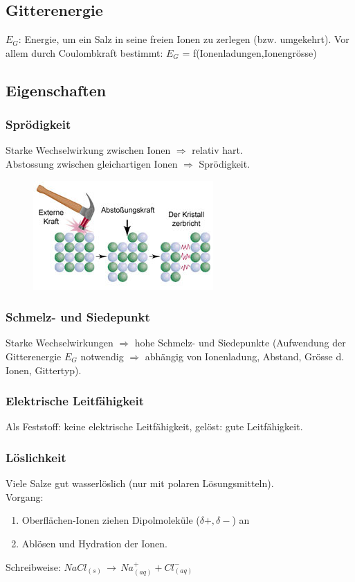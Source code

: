 \subsection{Gitterenergie}
$E_G$: Energie, um ein Salz in seine freien Ionen zu zerlegen (bzw. umgekehrt). Vor allem durch Coulombkraft bestimmt: $E_G$ = f(Ionenladungen,Ionengrösse) \\

\subsection{Eigenschaften}
\subsubsection{Sprödigkeit}
Starke Wechselwirkung zwischen Ionen $\Rightarrow$ relativ hart. \\
Abstossung zwischen gleichartigen Ionen $\Rightarrow$ Sprödigkeit. \\
\begin{figure}[htbp]
	\centering
	\includegraphics[width=0.5\linewidth]{images/5_Sproedigkeit.png}
\end{figure}

\subsubsection{Schmelz- und Siedepunkt}
Starke Wechselwirkungen $\Rightarrow$ hohe Schmelz- und Siedepunkte (Aufwendung der Gitterenergie $E_G$ notwendig $\Rightarrow$ abhängig von Ionenladung, Abstand, Grösse d. Ionen, Gittertyp). \\

\subsubsection{Elektrische Leitfähigkeit}
Als Feststoff: keine elektrische Leitfähigkeit, gelöst: gute Leitfähigkeit.

\subsubsection{Löslichkeit}
Viele Salze gut wasserlöslich (nur mit polaren Lösungsmitteln). \\
Vorgang:
\begin{enumerate}
	\item Oberflächen-Ionen ziehen Dipolmoleküle ($\delta+,\delta-$) an
	\item Ablösen und Hydration der Ionen.
\end{enumerate}
Schreibweise: $NaCl_{(s)} \, \rightarrow \, Na^+_{(aq)} + Cl^-_{(aq)}$ \\

